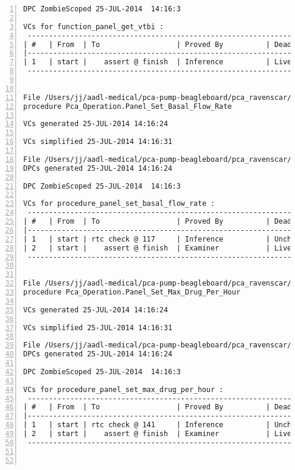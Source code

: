 \begin{lstlisting}[gobble=0, numbers=left, caption={POGS report for PCA Pump prototype}, label={listing:pca_ravenscar:pogs_full}]
DPC ZombieScoped 25-JUL-2014  14:16:3

VCs for function_panel_get_vtbi :
 -----------------------------------------------------------------------------
| #   | From  | To                  | Proved By          | Dead Path | Status |
|-----------------------------------------------------------------------------
| 1   | start |    assert @ finish  | Inference          | Live      |   IL   |
 -----------------------------------------------------------------------------


File /Users/jj/aadl-medical/pca-pump-beagleboard/pca_ravenscar/pca_operation/panel_set_basal_flow_rate.vcg
procedure Pca_Operation.Panel_Set_Basal_Flow_Rate

VCs generated 25-JUL-2014 14:16:24

VCs simplified 25-JUL-2014 14:16:31

File /Users/jj/aadl-medical/pca-pump-beagleboard/pca_ravenscar/pca_operation/panel_set_basal_flow_rate.dpc
DPCs generated 25-JUL-2014 14:16:24

DPC ZombieScoped 25-JUL-2014  14:16:3

VCs for procedure_panel_set_basal_flow_rate :
 -----------------------------------------------------------------------------
| #   | From  | To                  | Proved By          | Dead Path | Status |
|-----------------------------------------------------------------------------
| 1   | start | rtc check @ 117     | Inference          | Unchecked |   IU   |
| 2   | start |    assert @ finish  | Examiner           | Live      |   EL   |
 -----------------------------------------------------------------------------


File /Users/jj/aadl-medical/pca-pump-beagleboard/pca_ravenscar/pca_operation/panel_set_max_drug_per_hour.vcg
procedure Pca_Operation.Panel_Set_Max_Drug_Per_Hour

VCs generated 25-JUL-2014 14:16:24

VCs simplified 25-JUL-2014 14:16:31

File /Users/jj/aadl-medical/pca-pump-beagleboard/pca_ravenscar/pca_operation/panel_set_max_drug_per_hour.dpc
DPCs generated 25-JUL-2014 14:16:24

DPC ZombieScoped 25-JUL-2014  14:16:3

VCs for procedure_panel_set_max_drug_per_hour :
 -----------------------------------------------------------------------------
| #   | From  | To                  | Proved By          | Dead Path | Status |
|-----------------------------------------------------------------------------
| 1   | start | rtc check @ 141     | Inference          | Unchecked |   IU   |
| 2   | start |    assert @ finish  | Examiner           | Live      |   EL   |
 -----------------------------------------------------------------------------



\end{lstlisting}
